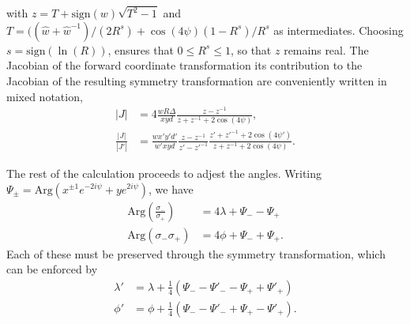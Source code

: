 \documentclass[aps,showpacs,twocolumn,prd,superscriptaddress,nofootinbib]{revtex4}
\newcommand\C{{\cos(4\psi)}}
\begin{document}
with $z=T+\mathrm{sign}(w)\sqrt{T^2-1}$ and $T=(({\hat w}+{\hat w}^{-1})/(2R^s)+\C(1-R^s)/R^s$ as intermediates.
Choosing $s=\mathrm{sign}(\ln(R))$, ensures that $0\leq R^s\leq1$, so that $z$ remains real. 
The Jacobian of the forward coordinate transformation its contribution to the Jacobian of the resulting
symmetry transformation are conveniently written in mixed notation,
\begin{align}
  |J|&=4\frac{wR\Delta}{xyd}\frac{z-z^{-1}}{z+z^{-1}+2\C},\\
  \frac{|J|}{|J'|}&=\frac{wx'y'd'}{w'xyd}\frac{z-z^{-1}}{z'-z'^{-1}}\frac{z'+z'^{-1}+2\cos(4\psi')}{z+z^{-1}+2\cos(4\psi)}.
\end{align}

The rest of the calculation proceeds to adjest the angles. Writing $\Psi_{\pm}=\mathrm{Arg}(x^{\pm1}e^{-2i\psi}+ye^{2i\psi})$,
we have
\begin{align}
  \mathrm{Arg}(\frac{\sigma_-}{\sigma_+})&=4\lambda+\Psi_--\Psi_+\\
  \mathrm{Arg}({\sigma_-}{\sigma_+})&=4\phi+\Psi_-+\Psi_+.
\end{align}
Each of these must be preserved through the symmetry transformation, which can be enforced by
\begin{align}
  \lambda'&=\lambda+\frac14(\Psi_--\Psi'_--\Psi_++\Psi'_+)\\
  \phi'&=\phi+\frac14(\Psi_--\Psi'_-+\Psi_+-\Psi'_+).
\end{align}
\end{document}
